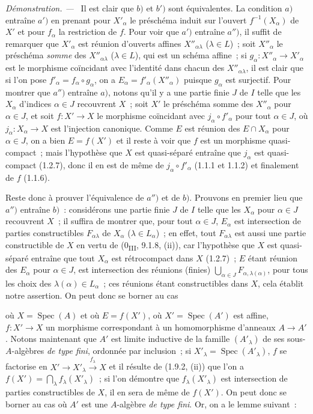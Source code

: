 \documentclass[10pt,oneside]{book}
\newcommand{\oldpage}[2][]{%
  \setcounter{footnote}{0}%
  \marginpar{\scriptsize\textbf{#1}~|~#2}\ignorespaces}
\newenvironment{proof}{%
  \par\medskip\noindent\textit{Démonstration. ---\ }}{\par}
\begin{document}
\begin{proof}
Il est clair que $b)$ et $b')$ sont équivalentes. La condition $a)$ entraîne
$a')$ en prenant pour $X'_\alpha$ le préschéma induit sur l'ouvert
$f^{-1}(X_\alpha)$ de $X'$ et pour $f_\alpha$ la restriction de $f$. Pour
voir que $a')$ entraîne $a'')$, il suffit de remarquer que $X'_\alpha$ est
réunion d'ouverts affines $X''_{\alpha\lambda}$ ($\lambda\in L$)~; soit
$X''_\alpha$ le préschéma \emph{somme} des $X''_{\alpha\lambda}$
($\lambda\in L$), qui est un schéma affine~; si
$g_\alpha:X''_\alpha\to X'_\alpha$ est le morphisme coïncidant avec
l'identité dans chacun des $X''_{\alpha\lambda}$, il est clair que si l'on
pose $f'_\alpha=f_\alpha\circ g_\alpha$, on a
$E_\alpha=f'_\alpha(X''_\alpha)$ puisque $g_\alpha$ est surjectif. Pour
montrer que $a'')$ entraîne $a)$, notons qu'il y a une partie finie $J$ de
$I$ telle que les $X_\alpha$ d'indices $\alpha\in J$ recouvrent $X$~; soit
$X'$ le préschéma somme des $X''_\alpha$ pour $\alpha\in J$, et soit
$f:X'\to X$ le morphisme coïncidant avec $j_\alpha\circ f'_\alpha$ pour tout
$\alpha\in J$, où $j_\alpha:X_\alpha\to X$ est l'injection canonique. Comme
$E$ est réunion des $E\cap X_\alpha$ pour $\alpha\in J$, on a bien
$E=f(X')$ et il reste à voir que $f$ est un morphisme quasi-compact~; mais
l'hypothèse que $X$ est quasi-séparé entraîne que $j_\alpha$ est
quasi-compact (1.2.7), donc il en est de même de
$j_\alpha\circ f'_\alpha$ (1.1.1 et 1.1.2) et finalement de $f$ (1.1.6).

Reste donc à prouver l'équivalence de $a'')$ et de $b)$. Prouvons en premier
lieu que $a'')$ entraîne $b)$~: considérons une partie finie $J$ de $I$ telle
que les $X_\alpha$ pour $\alpha\in J$ recouvrent $X$~; il suffira de montrer
que, pour tout $\alpha\in J$, $E_\alpha$ est intersection de parties
constructibles $F_{\alpha\lambda}$ de $X_\alpha$ ($\lambda\in L_\alpha$)~;
en effet, tout $F_{\alpha\lambda}$ est aussi une partie constructible de $X$
en vertu de (0\textsubscript{III}, 9.1.8, (ii)), car l'hypothèse que $X$ est
quasi-séparé entraîne que tout $X_\alpha$ est rétrocompact dans $X$ (1.2.7)~;
$E$ étant réunion des $E_\alpha$ pour $\alpha\in J$, est intersection des
réunions (finies) $\bigcup_{\alpha\in J}F_{\alpha,\lambda(\alpha)}$, pour
tous les choix des $\lambda(\alpha)\in L_\alpha$~; ces réunions étant
constructibles dans $X$, cela établit notre assertion. On peut donc se borner
au cas

\oldpage[IV-1]{243}

où $X=\operatorname{Spec}(A)$ et où $E=f(X')$, où
$X'=\operatorname{Spec}(A')$ est affine, $f:X'\to X$ un morphisme
correspondant à un homomorphisme d'anneaux $A\to A'$. Notons maintenant que
$A'$ est limite inductive de la famille $(A'_\lambda)$ de ses
sous-$A$-algèbres \emph{de type fini}, ordonnée par inclusion~; si
$X'_\lambda=\operatorname{Spec}(A'_\lambda)$, $f$ se factorise en
$X'\to X'_\lambda\xrightarrow{f_\lambda}X$ et il résulte de (1.9.2, (ii))
que l'on a $f(X')=\bigcap_\lambda f_\lambda(X'_\lambda)$~; si l'on démontre
que $f_\lambda(X'_\lambda)$ est intersection de parties constructibles de
$X$, il en sera de même de $f(X')$. On peut donc se borner au cas où $A'$ est
une $A$-algèbre \emph{de type fini}. Or, on a le lemme suivant~:
\end{proof}
\end{document}
